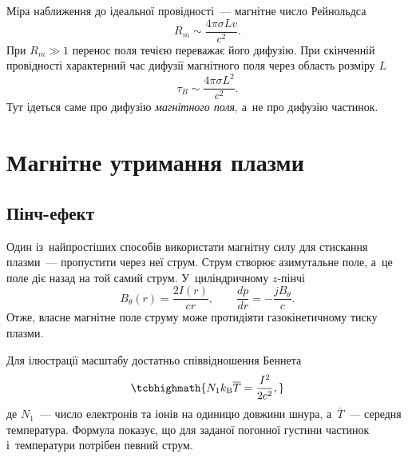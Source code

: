 Міра наближення до ідеальної провідності~--- магнітне число Рейнольдса
\begin{equation}\label{eq:magnetic-Reynolds}
	R_m\sim\frac{4\pi\sigma Lv}{c^2}.
\end{equation}
При $R_m\gg1$ перенос поля течією переважає його дифузію. При скінченній провідності
характерний час дифузії магнітного поля через область розміру $L$
\begin{equation}\label{eq:magnetic-diffusion-time}
	\tau_B\sim\frac{4\pi\sigma L^2}{c^2}.
\end{equation}
Тут ідеться саме про дифузію \emph{магнітного поля}, а~не про дифузію частинок.



\section{Магнітне утримання плазми}



\subsection*{Пінч-ефект}



Один із~найпростіших способів використати магнітну силу для стискання плазми~---
пропустити через неї струм. Струм створює азимутальне поле, а~це поле діє назад на той
самий струм. У~циліндричному $z$-пінчі
\begin{equation*}
	B_\theta(r)=\frac{2I(r)}{cr},
	\qquad
	\frac{dp}{dr}=-\frac{jB_\theta}{c}.
\end{equation*}
Отже, власне магнітне поле струму може протидіяти газокінетичному тиску плазми.

Для ілюстрації масштабу достатньо співвідношення Беннета
\begin{equation}\label{eq:Bennett}
	\tcbhighmath{N_1k_{\mathrm B}\overline T=\frac{I^2}{2c^2},}
\end{equation}
де $N_1$~--- число електронів та іонів на одиницю довжини шнура, а~$\overline T$~---
середня температура. Формула показує, що для заданої погонної густини частинок
і~температури потрібен певний струм.



